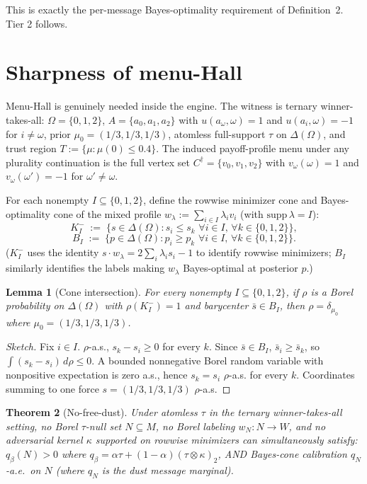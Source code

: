 \documentclass[11pt]{article}
\newtheorem{theorem}{Theorem}
\newtheorem{lemma}[theorem]{Lemma}
\theoremstyle{definition}
\theoremstyle{remark}
\newcommand{\Om}{\Omega}
\begin{document}
This is exactly the per-message Bayes-optimality requirement of
Definition~2. Tier 2 follows.

\section{Sharpness of menu-Hall}\label{sec:tight}

Menu-Hall is genuinely needed inside the engine. The witness is
ternary winner-takes-all: $\Om = \{0,1,2\}$, $A = \{a_0,a_1,a_2\}$
with $u(a_\omega,\omega) = 1$ and $u(a_i,\omega) = -1$ for
$i\ne\omega$, prior $\mu_0 = (1/3,1/3,1/3)$, atomless full-support
$\tau$ on $\Delta(\Om)$, and trust region
$T := \{\mu : \mu(0)\le 0.4\}$. The induced payoff-profile menu under
any plurality continuation is the full vertex set $C^\dagger = \{v_0,
v_1, v_2\}$ with $v_\omega(\omega) = 1$ and $v_\omega(\omega') = -1$
for $\omega'\ne\omega$.

For each nonempty $I \subseteq \{0,1,2\}$, define the rowwise
minimizer cone and Bayes-optimality cone of the mixed profile
$w_\lambda := \sum_{i\in I}\lambda_i v_i$ (with $\mathrm{supp}\,\lambda = I$):
\[
  K_I^- \;:=\; \{s\in\Delta(\Om) : s_i\le s_k\,\,\forall i\in I,\,\forall k\in\{0,1,2\}\},
\]
\[
  B_I \;:=\; \{p\in\Delta(\Om) : p_i\ge p_k\,\,\forall i\in I,\,\forall k\in\{0,1,2\}\}.
\]
($K_I^-$ uses the identity $s\cdot w_\lambda = 2\sum_i\lambda_i s_i - 1$
to identify rowwise minimizers; $B_I$ similarly identifies the labels
making $w_\lambda$ Bayes-optimal at posterior $p$.)

\begin{lemma}[Cone intersection]\label{lem:cone}
For every nonempty $I\subseteq\{0,1,2\}$, if $\rho$ is a Borel
probability on $\Delta(\Om)$ with $\rho(K_I^-) = 1$ and barycenter
$\bar s\in B_I$, then $\rho = \delta_{\mu_0}$ where $\mu_0 = (1/3,
1/3, 1/3)$.
\end{lemma}

\begin{proof}[Sketch]
Fix $i\in I$. $\rho$-a.s., $s_k - s_i \ge 0$ for every $k$. Since
$\bar s\in B_I$, $\bar s_i\ge \bar s_k$, so $\int(s_k - s_i)\,d\rho
\le 0$. A bounded nonnegative Borel random variable with nonpositive
expectation is zero a.s., hence $s_k = s_i$ $\rho$-a.s. for every
$k$. Coordinates summing to one force $s = (1/3, 1/3, 1/3)$
$\rho$-a.s.
\end{proof}

\begin{theorem}[No-free-dust]\label{thm:nofreedust}
Under atomless $\tau$ in the ternary winner-takes-all setting, no
Borel $\tau$-null set $N\subseteq M$, no Borel labeling $w_N: N\to W$,
and no adversarial kernel $\kappa$ supported on rowwise minimizers
can simultaneously satisfy: $q_\beta(N) > 0$ where
$q_\beta = \alpha\tau + (1-\alpha)(\tau\otimes\kappa)_2$, AND
Bayes-cone calibration $q_N$-a.e.\ on $N$ (where $q_N$ is the dust
message marginal).
\end{theorem}
\end{document}
